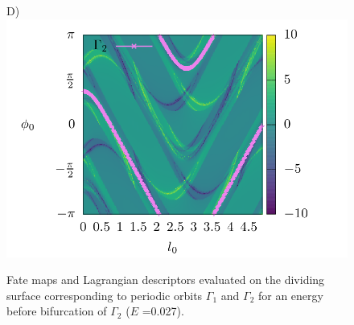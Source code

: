 \documentclass[10pt,aps,onecolumn,superscriptaddress]{revtex4-2}
\begin{document}
\begin{figure}[htbp]
	D)\includegraphics[scale=0.35]{ld_action_ds_gamma2_E_0027.png}
	\caption{ Fate maps and Lagrangian descriptors evaluated on the dividing surface corresponding to periodic orbits $\Gamma_1$ and $\Gamma_2$ for an energy before bifurcation of $\Gamma_2$    ($E$ =0.027). }
	\label{fig:ld_fm_ds_E_0027}
\end{figure}
\end{document}
